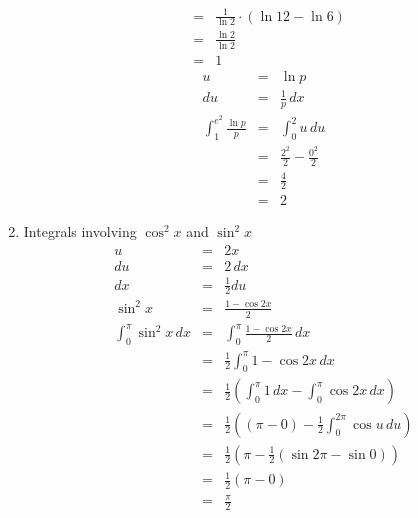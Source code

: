 \documentclass{article}
\begin{document}
\begin{enumerate}
\begin{eqnarray}
                                                      &=& \frac{1}{\ln{2}}\cdot\left(\ln{12} - \ln{6}\right) \\
                                                      &=& \frac{\ln{2}}{\ln{2}} \\
                                                      &=& 1
        \end{eqnarray}
        \begin{eqnarray}
            u &=& \ln{p} \\
            du &=& \frac{1}{p}\,dx \\
            \int_1^{e^2}{\frac{\ln{p}}{p}} &=& \int_0^2{u\,du} \\
                                           &=& \frac{2^2}{2} - \frac{0^2}{2} \\
                                           &=& \frac{4}{2} \\
                                           &=& 2
        \end{eqnarray}
    \item Integrals involving $\cos^2{x}$ and $\sin^2{x}$
        \begin{eqnarray}
            u &=& 2x \\
            du &=& 2\,dx \\
            dx &=& \frac{1}{2}du \\
            \sin^2{x} &=& \frac{1 - \cos{2x}}{2} \\
            \int_0^{\pi}{\sin^2{x}\,dx} &=& \int_0^{\pi}{\frac{1 - \cos{2x}}{2}\,dx} \\
                                        &=& \frac{1}{2}\int_0^{\pi}{1 - \cos{2x}\,dx} \\
                                        &=& \frac{1}{2}\left(\int_0^{\pi}{1\,dx} - \int_0^{\pi}{\cos{2x}\,dx}\right) \\
                                        &=& \frac{1}{2}\left(\left(\pi - 0\right) - \frac{1}{2}\int_0^{2\pi}{\cos{u}\,du}\right) \\
                                        &=& \frac{1}{2}\left(\pi - \frac{1}{2}\left(\sin{2\pi} - \sin{0}\right)\right) \\
                                        &=& \frac{1}{2}\left(\pi - 0\right) \\
                                        &=& \frac{\pi}{2}
        \end{eqnarray}
\end{enumerate}
\end{document}
